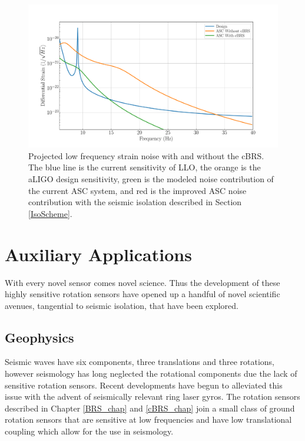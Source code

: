 \documentclass [12pt, proquest]{uwthesis}[2019]
\begin{document}
\begin{figure}[!h]
\begin{center}
\includegraphics[width=\textwidth]{cBRS_ASC.pdf}
\caption[Projected low frequency strain noise with and without the cBRS]{Projected low frequency strain noise with and without the cBRS. The blue line is the current sensitivity of LLO, the orange is the aLIGO design sensitivity, green is the modeled noise contribution of the current ASC system, and red is the improved ASC noise contribution with the seismic isolation described in Section \ref{IsoScheme}. }
\label{ascStrain}
\end{center}
\end{figure}

\chapter{Auxiliary Applications}
\quad With every novel sensor comes novel science. Thus the development of these highly sensitive rotation sensors have opened up a handful of novel scientific avenues, tangential to seismic isolation, that have been explored.

\section{Geophysics}
Seismic waves have six components, three translations and three rotations, however seismology has long neglected the rotational components due the lack of sensitive rotation sensors. Recent developments have begun to alleviated this issue with the advent of seismically relevant ring laser gyros. \cite{ring} The rotation sensors described in Chapter \ref{BRS_chap} and \ref{cBRS_chap} join a small class of ground rotation sensors that are sensitive at low frequencies and have low translational coupling which allow for the use in seismology.
\end{document}
